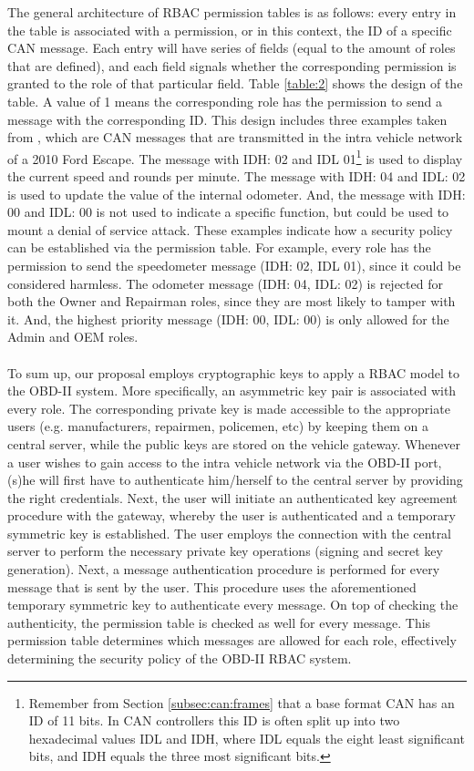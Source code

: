 The general architecture of RBAC permission tables is as follows: every entry in the table is associated with a permission, or in this context, the ID of a specific CAN message. Each entry will have series of fields (equal to the amount of roles that are defined), and each field signals whether the corresponding permission is granted to the role of that particular field. Table \ref{table:2} shows the design of the table. A value of 1 means the corresponding role has the permission to send a message with the corresponding ID. This design includes three examples taken from \cite{MillerC}, which are CAN messages that are transmitted in the intra vehicle network of a 2010 Ford Escape. The message with IDH: 02 and IDL 01\footnote{Remember from Section \ref{subsec:can:frames} that a base format CAN has an ID of 11 bits. In CAN controllers this ID is often split up into two hexadecimal values IDL and IDH, where IDL equals the eight least significant bits, and IDH equals the three most significant bits.} is used to display the current speed and rounds per minute. The message with IDH: 04 and IDL: 02 is used to update the value of the internal odometer. And, the message with IDH: 00 and IDL: 00 is not used to indicate a specific function, but could be used to mount a denial of service attack. These examples indicate how a security policy can be established via the permission table. For example, every role has the permission to send the speedometer message (IDH: 02, IDL 01), since it could be considered harmless. The odometer message (IDH: 04, IDL: 02) is rejected for both the Owner and Repairman roles, since they are most likely to tamper with it. And, the highest priority message (IDH: 00, IDL: 00) is only allowed for the Admin and OEM roles. \\ \\ To sum up, our proposal employs cryptographic keys to apply a RBAC model to the OBD-II system. More specifically, an asymmetric key pair is associated with every role. The corresponding private key is made accessible to the appropriate users (e.g. manufacturers, repairmen, policemen, etc) by keeping them on a central server, while the public keys are stored on the vehicle gateway. Whenever a user wishes to gain access to the intra vehicle network via the OBD-II port, (s)he will first have to authenticate him/herself to the central server by providing the right credentials. Next, the user will initiate an authenticated key agreement procedure with the gateway, whereby the user is authenticated and a temporary symmetric key is established. The user employs the connection with the central server to perform the necessary private key operations (signing and secret key generation). Next, a message authentication procedure is performed for every message that is sent by the user. This procedure uses the aforementioned temporary symmetric key to authenticate every message. On top of checking the authenticity, the permission table is checked as well for every message. This permission table determines which messages are allowed for each role, effectively determining the security policy of the OBD-II RBAC system.


